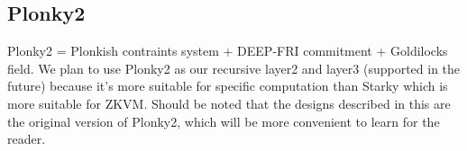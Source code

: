 \subsection{Plonky2} \label{sec:Plonky2}

Plonky2 \cite{website:plonky2} = Plonkish contraints system + DEEP-FRI commitment + Goldilocks field. We plan to use Plonky2 as our recursive layer2 and layer3 (supported in the future) because it's more suitable for specific computation than Starky which is more suitable for ZKVM. Should be noted that the designs described in this are the original version of Plonky2, which will be more convenient to learn for the reader.




